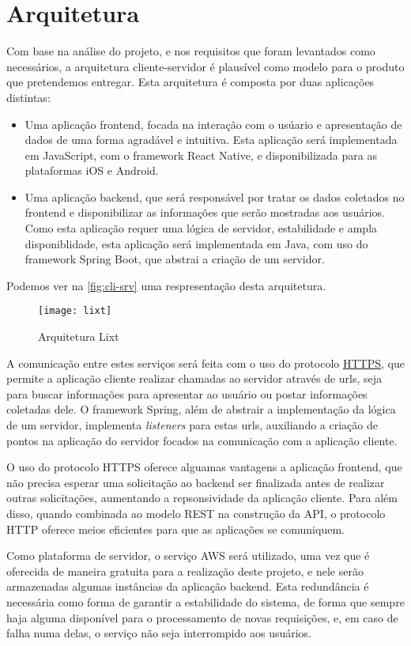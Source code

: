 \section{Arquitetura}

Com base na análise do projeto, e nos requisitos que foram levantados
como necessários, a arquitetura cliente-servidor é plausível como
modelo para o produto que pretendemos entregar.
Esta arquitetura é composta por duas aplicações distintas:
\begin{itemize}
\item Uma aplicação \gls{frontend}, focada na interação com o usúario
  e apresentação de dados de uma forma agradável e intuitiva. Esta
  aplicação será implementada em JavaScript, com o \gls{framework} React
  Native, e disponibilizada para as plataformas iOS e Android.
\item Uma aplicação \gls{backend}, que será responsável por tratar os
  dados coletados no \gls{frontend} e disponibilizar as informações
  que serão mostradas aos usuários. Como esta aplicação requer uma
  lógica de servidor, estabilidade e ampla disponiblidade, esta
  aplicação será implementada em Java, com uso do \gls{framework} Spring
  Boot, que abstrai a criação de um servidor.
\end{itemize}
Podemos ver na \autoref{fig:cli-srv} uma respresentação desta
arquitetura.

\begin{figure}[h]
  \centering
  \texttt{[image: lixt]}
  \caption{Arquitetura Lixt}
  \label{fig:cli-srv}
\end{figure}

A comunicação entre estes serviços será feita com o uso do protocolo
\label{sig:https}\hyperlink{s:http}{HTTPS}, que permite a aplicação
cliente realizar chamadas ao servidor através de urls, seja para
buscar informações para apresentar ao usuário ou postar informações
coletadas dele. O \gls{framework} Spring, além de abstrair a implementação
da lógica de um servidor, implementa \emph{listeners} para estas urls,
auxiliando a criação de pontos na aplicação do servidor focados na
comunicação com a aplicação cliente.

O uso do protocolo HTTPS oferece alguamas vantagens a aplicação
\gls{frontend}, que não precisa esperar uma solicitação ao
\gls{backend} ser finalizada antes de realizar outras solicitações,
aumentando a repsonsividade da aplicação cliente. Para além disso,
quando combinada ao modelo \label{sig:rest}\gls{REST} na
construção da \label{sig:API}\gls{API}, o protocolo HTTP
oferece meios eficientes para que as aplicações se comuniquem.

Como plataforma de servidor, o serviço AWS será utilizado, uma vez que
é oferecida de maneira gratuita para a realização deste projeto, e nele
serão armazenadas algumas instâncias da aplicação \gls{backend}.
Esta redundância é necessária como forma de garantir a estabilidade do
sistema, de forma que sempre haja alguma disponível para o
processamento de novas requisições, e, em caso de falha numa delas, o
serviço não seja interrompido aos usuários.

